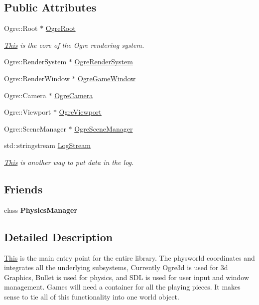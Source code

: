 \subsection*{Public Attributes}
\begin{DoxyCompactItemize}
\item 
Ogre::Root $\ast$ \hyperlink{classphys_1_1World_a07bd53ea67c1a956004a007f99f7fc5b}{OgreRoot}
\begin{DoxyCompactList}\small\item\em \hyperlink{structThis}{This} is the core of the Ogre rendering system. \item\end{DoxyCompactList}\item 
Ogre::RenderSystem $\ast$ \hyperlink{classphys_1_1World_a2886c543dbb9e102d83c660175f59cd0}{OgreRenderSystem}
\item 
Ogre::RenderWindow $\ast$ \hyperlink{classphys_1_1World_a66053249b1d5d177595f229d339f5122}{OgreGameWindow}
\item 
Ogre::Camera $\ast$ \hyperlink{classphys_1_1World_a116475cb7c43e61e2e0cb04606282426}{OgreCamera}
\item 
Ogre::Viewport $\ast$ \hyperlink{classphys_1_1World_ae8ece0488ad1897bbd477f83a567af04}{OgreViewport}
\item 
Ogre::SceneManager $\ast$ \hyperlink{classphys_1_1World_ad90c8938abf8d159722ad5dfacb18cea}{OgreSceneManager}
\item 
std::stringstream \hyperlink{classphys_1_1World_a6d8b325a077afc924afb70c259ec0299}{LogStream}
\begin{DoxyCompactList}\small\item\em \hyperlink{structThis}{This} is another way to put data in the log. \item\end{DoxyCompactList}\end{DoxyCompactItemize}
\subsection*{Friends}
\begin{DoxyCompactItemize}
\item 
\hypertarget{classphys_1_1World_a139cf05ac01161b7071c8a037c841683}{
class {\bfseries PhysicsManager}}
\label{da/ddf/classphys_1_1World_a139cf05ac01161b7071c8a037c841683}

\end{DoxyCompactItemize}


\subsection{Detailed Description}
\hyperlink{structThis}{This} is the main entry point for the entire library. The physworld coordinates and integrates all the underlying subsystems, Currently Ogre3d is used for 3d Graphics, Bullet is used for physics, and SDL is used for user input and window management. Games will need a container for all the playing pieces. It makes sense to tie all of this functionality into one world object. 

